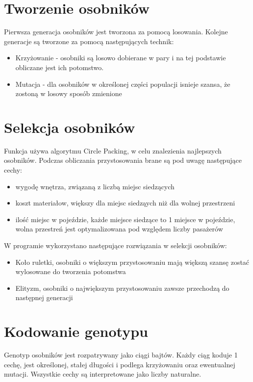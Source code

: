 \documentclass[bibtotocnumbered, headsepline,normalheadings,12pt,polish]{scrreprt}
\begin{document}
\section{Tworzenie osobników}
Pierwsza generacja osobników jest tworzona za pomocą losowania.
Kolejne generacje są tworzone za pomocą następujących technik:
\begin{itemize}
    \item Krzyżowanie - osobniki są losowo dobierane w pary i na tej podstawie obliczane jest ich potomstwo.
    \item Mutacja - dla osobników w określonej części populacji isnieje szansa, że zostoną w losowy sposób zmienione
\end{itemize}

\section{Selekcja osobników}

Funkcja używa algorytmu Circle Packing, w celu znalezienia najlepszych osobników.
Podczas obliczania przystosowania brane są pod uwagę następujące cechy:
\begin{itemize}
    \item wygodę wnętrza, związaną z liczbą miejsc siedzących 
    \item koszt materiałow, większy dla miejsc siedząych niż dla wolnej przestrzeni
    \item ilość miejsc w pojeździe, każde miejsce siedzące to 1 miejsce w pojeździe, wolna przestreń jest optymalizowana pod względem liczby pasażerów
\end{itemize}


W programie wykorzystano następujące rozwiązania w selekcji osobników:
\begin{itemize}
    \item Koło ruletki, osobniki o większym przystosowaniu mają większą szansę zostać wylosowane do tworzenia potomstwa
    \item Elityzm, osobniki o największym przystosowaniu zawsze przechodzą do następnej generacji
\end{itemize}

\section{Kodowanie genotypu}
Genotyp osobników jest rozpatrywany jako ciągi bajtów. Każdy ciąg koduje 1 cechę, jest określonej, stałej długości i podlega  krzyżowaniu oraz ewentualnej mutacji.
Wszystkie cechy są interpretowane jako liczby naturalne. 
\end{document}

